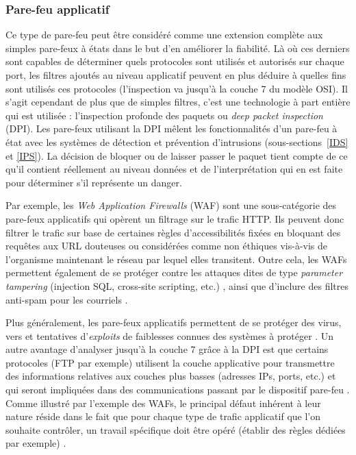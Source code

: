 \documentclass[]{article}
\begin{document}
\subsubsection{Pare-feu applicatif}\label{appfw}

\par Ce type de pare-feu peut être considéré comme une extension complète aux simples pare-feux à états dans le but d'en améliorer la fiabilité. Là où ces derniers sont capables de déterminer quels protocoles sont utilisés et autorisés sur chaque port, les filtres ajoutés au niveau applicatif peuvent en plus déduire à quelles fins sont utilisés ces protocoles (l'inspection va jusqu'à la couche 7 du modèle OSI). Il s'agit cependant de plus que de simples filtres, c'est une technologie à part entière qui est utilisée : l'inspection profonde des paquets ou \textit{deep packet inspection} (DPI). Les pare-feux utilisant la DPI mêlent les fonctionnalités d'un pare-feu à état avec les systèmes de détection et prévention d'intrusions (sous-sections~\ref{IDS} et \ref{IPS}). La décision de bloquer ou de laisser passer le paquet tient compte de ce qu'il contient réellement au niveau données et de l'interprétation qui en est faite pour déterminer s'il représente un danger.\\

\label{waf}
\par Par exemple, les \textit{Web Application Firewalls} (WAF) sont une sous-catégorie des pare-feux applicatifs qui opèrent un filtrage sur le trafic HTTP. Ils peuvent donc filtrer le trafic sur base de certaines règles d'accessibilités fixées en bloquant des requêtes aux URL douteuses ou considérées comme non éthiques vis-à-vis de l'organisme maintenant le réseau par lequel elles transitent. Outre cela, les WAFs permettent également de se protéger contre les attaques dites de type \textit{parameter tampering} (injection SQL, cross-site scripting, etc.) \cite{Palka2011}, ainsi que d'inclure des filtres anti-spam pour les courriels \cite{wikifwFR}.\\

\par Plus généralement, les pare-feux applicatifs permettent de se protéger des virus, vers et tentatives d'\textit{exploits} de faiblesses connues des systèmes à protéger \cite{wikiappfw} \cite{Palka2011}. Un autre avantage d'analyser jusqu'à la couche 7 grâce à la DPI est que certains protocoles (FTP par exemple) utilisent la couche applicative pour transmettre des informations relatives aux couches plus basses (adresses IPs, ports, etc.) et qui seront impliquées dans des communications passant par le dispositif pare-feu \cite{wikifwFR}. Comme illustré par l'exemple des WAFs, le principal défaut inhérent à leur nature réside dans le fait que pour chaque type de trafic applicatif que l'on souhaite contrôler, un travail spécifique doit être opéré (établir des règles dédiées par exemple) \cite{wikifw}. 
\end{document}
